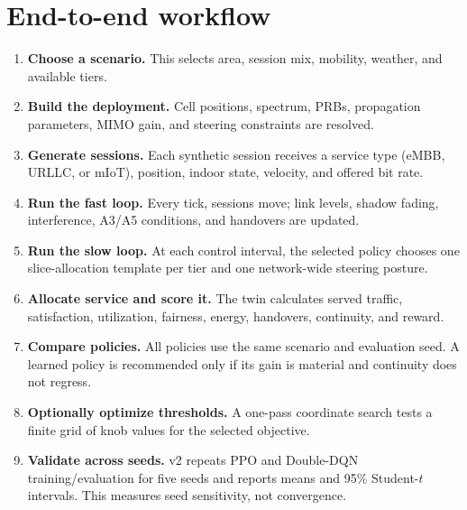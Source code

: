 \documentclass[10pt]{article}
\begin{document}
\section{End-to-end workflow}
\begin{enumerate}
  \item \textbf{Choose a scenario.} This selects area, session mix, mobility, weather, and available tiers.
  \item \textbf{Build the deployment.} Cell positions, spectrum, PRBs, propagation parameters, MIMO gain, and steering constraints are resolved.
  \item \textbf{Generate sessions.} Each synthetic session receives a service type (eMBB, URLLC, or mIoT), position, indoor state, velocity, and offered bit rate.
  \item \textbf{Run the fast loop.} Every tick, sessions move; link levels, shadow fading, interference, A3/A5 conditions, and handovers are updated.
  \item \textbf{Run the slow loop.} At each control interval, the selected policy chooses one slice-allocation template per tier and one network-wide steering posture.
  \item \textbf{Allocate service and score it.} The twin calculates served traffic, satisfaction, utilization, fairness, energy, handovers, continuity, and reward.
  \item \textbf{Compare policies.} All policies use the same scenario and evaluation seed. A learned policy is recommended only if its gain is material and continuity does not regress.
  \item \textbf{Optionally optimize thresholds.} A one-pass coordinate search tests a finite grid of knob values for the selected objective.
  \item \textbf{Validate across seeds.} v2 repeats PPO and Double-DQN training/evaluation for five seeds and reports means and 95\% Student-$t$ intervals. This measures seed sensitivity, not convergence.
\end{enumerate}
\end{document}
